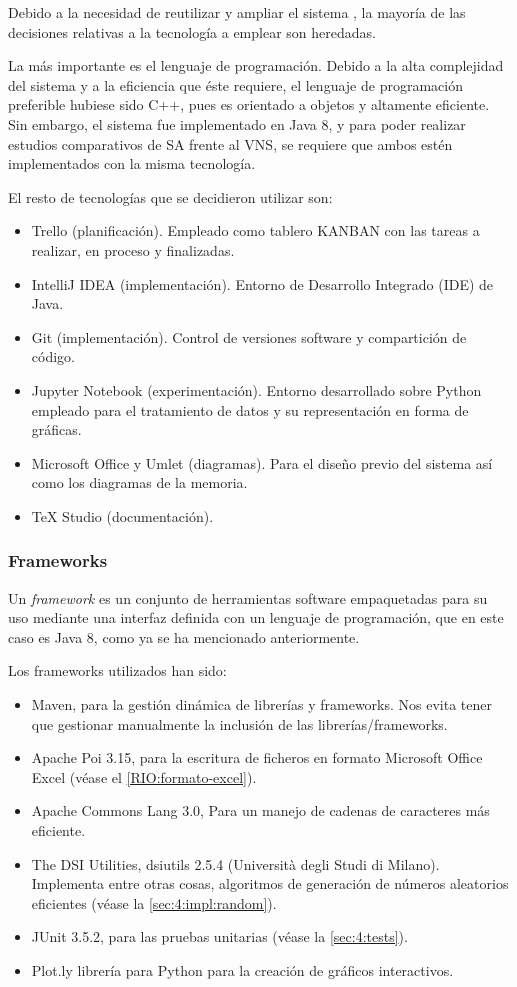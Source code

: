 Debido a la necesidad de reutilizar y ampliar el sistema \legacy{}, la mayoría de las decisiones relativas a la tecnología a emplear son heredadas. 

La más importante es el lenguaje de programación. Debido a la alta complejidad del sistema y a la eficiencia que éste requiere, el lenguaje de programación preferible hubiese sido C++, pues es orientado a objetos y altamente eficiente. Sin embargo, el sistema \legacy{} fue implementado en Java 8, y para poder realizar estudios comparativos de SA frente al VNS, se requiere que ambos estén implementados con la misma tecnología.

El resto de tecnologías que se decidieron utilizar son:

\begin{itemize}
	\item Trello (planificación). Empleado como tablero KANBAN con las tareas a realizar, en proceso y finalizadas.
	\item IntelliJ IDEA (implementación). Entorno de Desarrollo Integrado (IDE) de Java.
	\item Git (implementación). Control de versiones software y compartición de código.
	\item Jupyter Notebook (experimentación). Entorno desarrollado sobre Python empleado para el tratamiento de datos y su representación en forma de gráficas.
	\item Microsoft Office y Umlet (diagramas). Para el diseño previo del sistema así como los diagramas de la memoria.
	\item \TeX{} Studio (documentación).
\end{itemize}

\subsubsection{Frameworks}
Un \textit{framework} es un conjunto de herramientas software empaquetadas para su uso mediante una interfaz definida con un lenguaje de programación, que en este caso es Java 8, como ya se ha mencionado anteriormente.

Los frameworks utilizados han sido:

\begin{itemize}
	\item Maven, para la gestión dinámica de librerías y frameworks. Nos evita tener que gestionar manualmente la inclusión de las librerías/frameworks.
	\item Apache Poi 3.15, para la escritura de ficheros en formato Microsoft Office Excel (véase el \ref{RIO:formato-excel}).
	\item Apache Commons Lang 3.0, Para un manejo de cadenas de caracteres más eficiente.
	\item The DSI Utilities, dsiutils 2.5.4 (Università degli Studi di Milano). Implementa entre otras cosas, algoritmos de generación de números aleatorios eficientes (véase la \autoref{sec:4:impl:random}).
	\item JUnit 3.5.2, para las pruebas unitarias (véase la \autoref{sec:4:tests}).
	\item Plot.ly librería para Python para la creación de gráficos interactivos.
\end{itemize}

